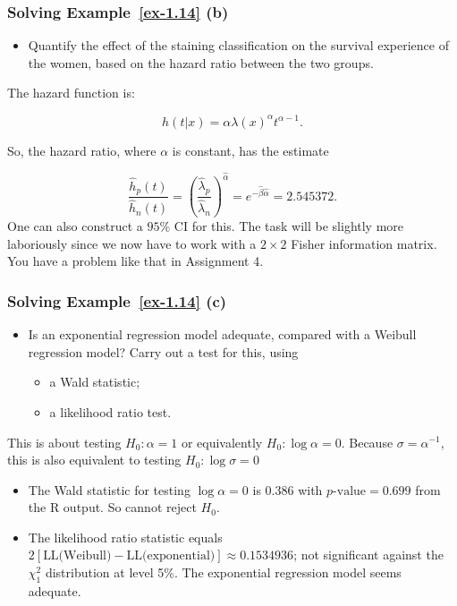 \documentclass{beamer}
\begin{document}
\begin{frame} \frametitle{Solving Example~\ref{ex-1.14} (b)}

\begin{itemize}
\item [(b)] Quantify the effect of the staining classification on the
  survival experience of the women, based on the hazard ratio between the two groups.
\end{itemize}

The  hazard function is:

\[
h(t|x) = \alpha \lambda(x)^{\alpha} t^{\alpha-1}.
\]

So, the hazard ratio, where $\alpha$ is constant, has the estimate

\[
\frac{\hat{h}_p(t)}{\hat{h}_n(t)} =
\left(\frac{\hat \lambda_p}{\hat \lambda_n}\right)^{\hat \alpha} = e^{-\hat{\beta}\hat{\alpha}}= 2.545372 .
\]
One can also construct a $95\%$ CI for this. The task will be slightly more laboriously since we now have to work with a $2 \times 2$ Fisher information matrix. You have a problem like that  in Assignment 4. 
\end{frame}

\begin{frame} \frametitle{Solving Example~\ref{ex-1.14} (c)}

\begin{itemize}
\item [(c)] Is an exponential regression model adequate, compared with a
  Weibull regression model?  Carry out a test for this, using
  \begin{itemize} 
  \item [(c.1)] a Wald statistic;
  \item [(c.2)] a likelihood ratio test.
  \end{itemize}
\end{itemize}

This is about testing $H_0:\alpha=1$ or equivalently $H_0: \log\alpha=0$. Because $\sigma = \alpha^{-1}$, this is also equivalent to testing $H_0: \log\sigma=0$
\begin{itemize}
\item The Wald statistic for testing $\log\alpha=0$ is 0.386 with $p\mbox{-value}=0.699$
from the R output.
So cannot reject $H_0$. 
\item The likelihood ratio statistic equals $2[\mbox{LL(Weibull)}-\mbox{LL(exponential)}]
\approx 0.1534936$; not significant against the $\chi^2_1$ distribution at level 5\%.
The exponential regression model seems adequate. 
\end{itemize}

\end{frame}
\end{document}
